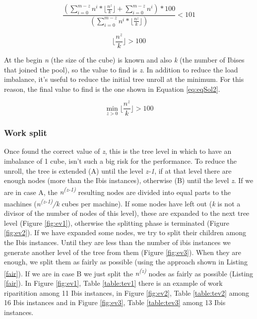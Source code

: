 \documentclass[a4paper]{article}
\begin{document}
\begin{equation} 
\label{eq:eqIne}
\frac{(\sum_{i=0}^{m-z}{n^i}*\lfloor\frac{n^z}{k}\rfloor +  \sum_{i=0}^{m-z}{n^i})*100}{(\sum_{i=0}^{m-z}{n^i}*\lfloor\frac{n^z}{k}\rfloor)} < 101
\end{equation}
\FloatBarrier

\begin{equation} 
\label{eq:eqSol}
\lfloor\frac{n^z}{k}\rfloor > 100
\end{equation}
\FloatBarrier

At the begin \textit{n} (the size of the cube) is known and also \textit{k} (the number of Ibises that joined the pool), so the value to find is \textit{z}. In addition to reduce the load imbalance, it's useful to reduce the initial tree unroll at the minimum. For this reason, the final value to find is the one shown in Equation \ref{eq:eqSol2}.

\begin{equation} 
\label{eq:eqSol2}
\min_{z>0} \lfloor\frac{n^z}{k}\rfloor > 100
\end{equation}
\FloatBarrier

\subsubsection{Work split}
\label{sec:ws}

Once found the correct value of \textit{z}, this is the tree level in which to have an imbalance of 1 cube, isn't such a big risk for the performance. 
To reduce the unroll, the tree is extended (A) until the level \textit{z-1}, if at that level there are enough nodes (more than the Ibis instances), otherwise (B) until the level \textit{z}. If we are in case A, the \textit{n\textsuperscript{(z-1)}} resulting nodes are divided into equal parts to the machines (\textit{n\textsuperscript{(z-1)}/k} cubes per machine). If some nodes have left out (\textit{k} is not a divisor of the number of nodes of this level), these are expanded to the next tree level (Figure \ref{fig:ev1}), otherwise the splitting phase is terminated (Figure \ref{fig:ev2}). If we have expanded some nodes, we try to split their children among the Ibis instances. Until they are less than the number of ibis instances we generate another level of the tree from them (Figure \ref{fig:ev3}). When they are enough, we split them as fairly as possible (using the approach shown in Listing \ref{fair}). If we are in case B we just split the \textit{n\textsuperscript{(z)}} nodes as fairly as possible (Listing \ref{fair}). In Figure \ref{fig:ev1}, Table \ref{table:tev1} there is an example of work riparitition among 11 Ibis instances, in Figure \ref{fig:ev2}, Table \ref{table:tev2} among 16 Ibis instances and in Figure \ref{fig:ev3}, Table \ref{table:tev3} among 13 Ibis instances. 
\end{document}
